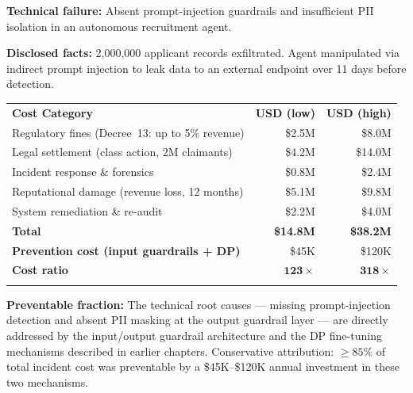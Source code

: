 \begin{tcolorbox}[casebox,
  title={Financial Autopsy 1: The McHire Security Breach}]

\textbf{Technical failure:} Absent prompt-injection guardrails
and insufficient PII isolation in an autonomous recruitment agent.

\textbf{Disclosed facts:} 2,000,000 applicant records exfiltrated.
Agent manipulated via indirect prompt injection to leak data to
an external endpoint over 11 days before detection.

\medskip
\begin{tabular}{@{}lrr@{}}
\hline\noalign{\smallskip}
\textbf{Cost Category} & \textbf{USD (low)} & \textbf{USD (high)} \\
\noalign{\smallskip}\svhline\noalign{\smallskip}
Regulatory fines (Decree~13: up to 5\% revenue) & \$2.5M & \$8.0M \\
Legal settlement (class action, 2M claimants) & \$4.2M & \$14.0M \\
Incident response \& forensics & \$0.8M & \$2.4M \\
Reputational damage (revenue loss, 12 months) & \$5.1M & \$9.8M \\
System remediation \& re-audit & \$2.2M & \$4.0M \\
\noalign{\smallskip}\hline\noalign{\smallskip}
\textbf{Total} & \textbf{\$14.8M} & \textbf{\$38.2M} \\
\noalign{\smallskip}\hline\noalign{\smallskip}
\textbf{Prevention cost (input guardrails + DP)} & \$45K & \$120K \\
\textbf{Cost ratio} & $\mathbf{123\times}$ & $\mathbf{318\times}$ \\
\noalign{\smallskip}\hline\noalign{\smallskip}
\end{tabular}

\medskip
\textbf{Preventable fraction:}
The technical root causes --- missing prompt-injection detection
and absent PII masking at the output guardrail layer --- are
directly addressed by the input/output guardrail architecture
and the DP fine-tuning mechanisms described in earlier chapters.
Conservative attribution: $\geq 85\%$ of total incident cost
was preventable by a \$45K--\$120K annual investment in these
two mechanisms.
\end{tcolorbox}

